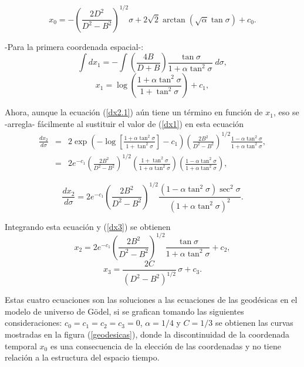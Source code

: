 \documentclass[11pt]{book}
\begin{document}
\begin{equation} 
x_{0}=-\left(\frac{2D^{2}}{D^{2}-B^{2}}\right)^{1/2}\sigma+2\sqrt{2}\arctan(\sqrt{\alpha}\tan\sigma)+c_{0}. 
\label{x0}
\end{equation}

-Para la primera coordenada espacial-:
\[
\int dx_1 =- \int \left( \frac{4B}{D+B} \right) \frac{\tan \sigma}{1+\alpha \tan^2 \sigma} \; d\sigma,
\]
%
\begin{equation}
x_{1}=\log\left(\frac{1+\alpha \tan^{2}\sigma}{1+\tan^{2}\sigma}\right)+c_{1},
\label{x1}
\end{equation}

Ahora, aunque la ecuación (\ref{dx2.1}) aún tiene un término en función de $x_1$, eso se -arregla- fácilmente al sustituir el valor de (\ref{dx1}) en esta ecuación
\begin{eqnarray}
\frac{dx_{2}}{d\sigma}&=&2 \exp \left( -\log\left[\frac{1+\alpha \tan^{2}\sigma}{1+\tan^{2}\sigma}\right] -c_{1} \right) \left( \frac{2B^2}{D^2-B^2} \right)^{1/2} \frac{1-\alpha \tan^{2}\sigma}{1+\alpha \tan^{2}\sigma}, \nonumber
\\
\nonumber
&=&2 e^{-c_1}\left( \frac{2B^2}{D^2-B^2} \right)^{1/2} \left( \frac{1+\tan^{2}\sigma}{1+\alpha \tan^{2}\sigma} \right) \left( \frac{1-\alpha \tan^{2}\sigma}{1+\alpha \tan^{2}\sigma} \right),
\end{eqnarray}

\begin{equation}
\frac{dx_{2}}{d\sigma}=2e^{-c_{1}}\left(\frac{2B^{2}}{D^{2}-B^{2}}\right)^{1/2}\frac{(1-\alpha \tan^{2}\sigma)\sec^{2}\sigma}{(1+\alpha \tan^{2}\sigma)^{2}}.
\label{dx2}
\end{equation}

Integrando esta ecuación y (\ref{dx3}) se obtienen
\begin{equation}
x_{2}=2e^{-c_{1}}\left(\frac{2B^{2}}{D^{2}-B^{2}}\right)^{1/2} \frac{\tan\sigma}{1+\alpha \tan^{2}\sigma}+c_{2},
\label{x2}
\end{equation}
\begin{equation}
x_{3}=\frac{2 C}{(D^2-B^2)^{1/2}}\, \sigma + c_3.
\label{x3}
\end{equation}


Estas cuatro ecuaciones son las soluciones a las ecuaciones de las geodésicas en el modelo de universo de Gödel, si se grafican tomando las siguientes consideraciones: $c_0=c_1=c_2=c_3=0$, $\alpha = 1/4$ y $C= 1/3$ %
se obtienen las curvas mostradas en la figura (\ref{geodesicas}), donde la discontinuidad de la coordenada temporal $x_0$ es una consecuencia de la elección de las coordenadas y no tiene relación a la estructura del espacio tiempo.
\end{document}
